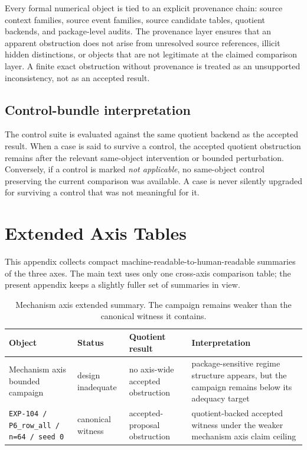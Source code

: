 \documentclass[11pt]{article}
\theoremstyle{definition}
\begin{document}
Every formal numerical object is tied to an explicit provenance chain: source context families, source event families, source candidate tables, quotient backends, and package-level audits. The provenance layer ensures that an apparent obstruction does not arise from unresolved source references, illicit hidden distinctions, or objects that are not legitimate at the claimed comparison layer. A finite exact obstruction without provenance is treated as an unsupported inconsistency, not as an accepted result.

\subsection{Control-bundle interpretation}

The control suite is evaluated against the same quotient backend as the accepted result. When a case is said to survive a control, the accepted quotient obstruction remains after the relevant same-object intervention or bounded perturbation. Conversely, if a control is marked \emph{not applicable}, no same-object control preserving the current comparison was available. A case is never silently upgraded for surviving a control that was not meaningful for it.

\section{Extended Axis Tables}\label{app:axis-tables}
This appendix collects compact machine-readable-to-human-readable summaries of the three axes. The main text uses only one cross-axis comparison table; the present appendix keeps a slightly fuller set of summaries in view.

\begin{table}[t]
    \centering
    \caption{Mechanism axis extended summary. The campaign remains weaker than the canonical witness it contains.}
    \label{tab:mechanism-axis-extended}
    \footnotesize
    \begin{tabularx}{\linewidth}{>{\raggedright\arraybackslash}p{3.4cm}>{\raggedright\arraybackslash}p{2.0cm}>{\raggedright\arraybackslash}p{2.2cm}>{\raggedright\arraybackslash}X}
        \toprule
        Object & Status & Quotient result & Interpretation \\
        \midrule
        Mechanism axis bounded campaign & design inadequate & no axis-wide accepted obstruction & package-sensitive regime structure appears, but the campaign remains below its adequacy target \\
        \texttt{EXP-104 / P6\_row\_all / n=64 / seed 0} & canonical witness & accepted-proposal obstruction & quotient-backed accepted witness under the weaker mechanism axis claim ceiling \\
        \bottomrule
    \end{tabularx}
\end{table}
\end{document}
